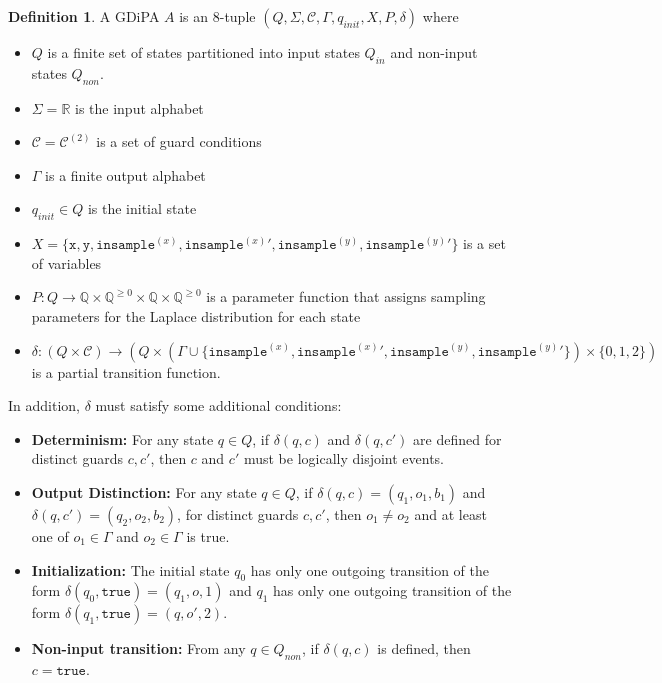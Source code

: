 \documentclass[12pt]{article}
\newcommand{\QQ}{\mathbb{Q}}
\newcommand{\RR}{\mathbb{R}}
\theoremstyle{definition}
\newtheorem{defn}[thm]{Definition}
\begin{document}
\begin{defn}
    A GDiPA $A$ is an 8-tuple $(Q, \Sigma, \mathcal{C}, \Gamma, q_{init}, X, P, \delta)$ where
    \begin{itemize}
        \item $Q$ is a finite set of states partitioned into input states $Q_{in}$ and non-input states $Q_{non}$. 
        \item $\Sigma = \RR$ is the input alphabet
        \item $\mathcal{C} = \mathcal{C}^{(2)}$ is a set of guard conditions
        \item $\Gamma$ is a finite output alphabet
        \item $q_{init}\in Q$ is the initial state
        \item $X = \{\texttt{x}, \texttt{y}, \texttt{insample}^{(x)}, \texttt{insample}^{(x)}\prime, \texttt{insample}^{(y)}, \texttt{insample}^{(y)}\prime\}$ is a set of variables
        \item $P: Q\to \QQ\times \QQ^{\geq 0}\times \QQ\times  \QQ^{\geq 0}$ is a parameter function that assigns sampling parameters for the Laplace distribution for each state
        \item $\delta:(Q\times \mathcal{C})\to (Q\times (\Gamma \cup \{\texttt{insample}^{(x)}, \texttt{insample}^{(x)}\prime, \texttt{insample}^{(y)}, \texttt{insample}^{(y)}\prime\})\times \{0, 1, 2\})$ is a partial transition function. 
    \end{itemize}
    In addition, $\delta$ must satisfy some additional conditions:
    \begin{itemize}
        \item \textbf{Determinism:} For any state $q\in Q$, if $\delta(q, c)$ and $\delta(q, c')$ are defined for distinct guards $c, c'$,  then $c$ and $c'$ must be logically disjoint events.

        \item \textbf{Output Distinction:} For any state $q\in Q$, if $\delta(q, c) = (q_1, o_1, b_1)$ and $\delta(q, c') = (q_2, o_2, b_2)$, for distinct guards $c, c'$, then $o_1\neq o_2$ and at least one of $o_1\in \Gamma$ and $o_2\in \Gamma$ is true.

        \item \textbf{Initialization:} The initial state $q_0$ has only one outgoing transition of the form $\delta(q_0, \texttt{true}) = (q_1, o, 1)$ and $q_1$ has only one outgoing transition of the form $\delta(q_1, \texttt{true}) = (q, o', 2)$.

        \item \textbf{Non-input transition:} From any $q\in Q_{non}$, if $\delta(q, c)$ is defined, then $c=\texttt{true}$.
    \end{itemize}
\end{defn}
\end{document}
